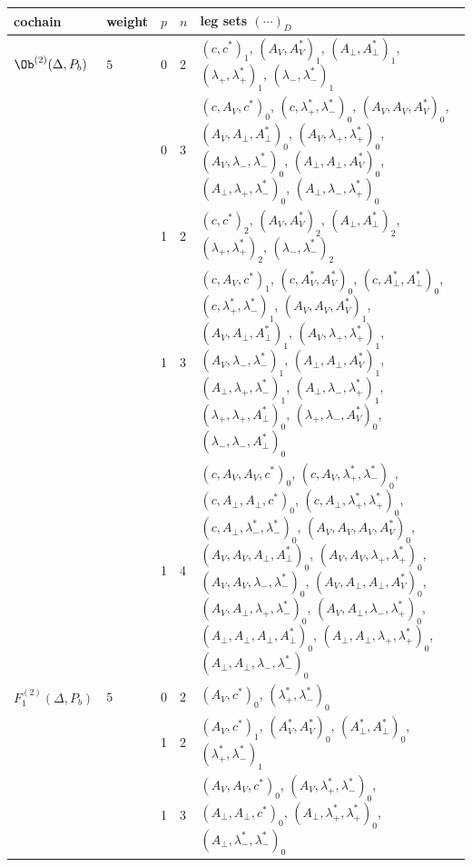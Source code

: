 {\begin{longtable}{>{\raggedright}p{2.3cm}|p{0.6cm}|p{0.25cm}|p{0.25cm}|>{\raggedright\arraybackslash}p{11.6cm}}
cochain & weight & $p$ & $n$ & leg sets $(\cdots)_D$\\
\hline
\endhead
$\Ob^{(2)}(\Delta,P_b)$ & $5$ & 0 & 2 & $(c,c^*)_{1}$, $(A_V,A^*_V)_{1}$, $(A_\perp,A^*_\perp)_{1}$, $(\lambda_+,\lambda^*_+)_{1}$, $(\lambda_-,\lambda^*_-)_{1}$ \\
 &  & 0 & 3 & $(c,A_V,c^*)_{0}$, $(c,\lambda^*_+,\lambda^*_-)_{0}$, $(A_V,A_V,A^*_V)_{0}$, $(A_V,A_\perp,A^*_\perp)_{0}$, $(A_V,\lambda_+,\lambda^*_+)_{0}$, $(A_V,\lambda_-,\lambda^*_-)_{0}$, $(A_\perp,A_\perp,A^*_V)_{0}$, $(A_\perp,\lambda_+,\lambda^*_-)_{0}$, $(A_\perp,\lambda_-,\lambda^*_+)_{0}$ \\
 &  & 1 & 2 & $(c,c^*)_{2}$, $(A_V,A^*_V)_{2}$, $(A_\perp,A^*_\perp)_{2}$, $(\lambda_+,\lambda^*_+)_{2}$, $(\lambda_-,\lambda^*_-)_{2}$ \\
 &  & 1 & 3 & $(c,A_V,c^*)_{1}$, $(c,A^*_V,A^*_V)_{0}$, $(c,A^*_\perp,A^*_\perp)_{0}$, $(c,\lambda^*_+,\lambda^*_-)_{1}$, $(A_V,A_V,A^*_V)_{1}$, $(A_V,A_\perp,A^*_\perp)_{1}$, $(A_V,\lambda_+,\lambda^*_+)_{1}$, $(A_V,\lambda_-,\lambda^*_-)_{1}$, $(A_\perp,A_\perp,A^*_V)_{1}$, $(A_\perp,\lambda_+,\lambda^*_-)_{1}$, $(A_\perp,\lambda_-,\lambda^*_+)_{1}$, $(\lambda_+,\lambda_+,A^*_\perp)_{0}$, $(\lambda_+,\lambda_-,A^*_V)_{0}$, $(\lambda_-,\lambda_-,A^*_\perp)_{0}$ \\
 &  & 1 & 4 & $(c,A_V,A_V,c^*)_{0}$, $(c,A_V,\lambda^*_+,\lambda^*_-)_{0}$, $(c,A_\perp,A_\perp,c^*)_{0}$, $(c,A_\perp,\lambda^*_+,\lambda^*_+)_{0}$, $(c,A_\perp,\lambda^*_-,\lambda^*_-)_{0}$, $(A_V,A_V,A_V,A^*_V)_{0}$, $(A_V,A_V,A_\perp,A^*_\perp)_{0}$, $(A_V,A_V,\lambda_+,\lambda^*_+)_{0}$, $(A_V,A_V,\lambda_-,\lambda^*_-)_{0}$, $(A_V,A_\perp,A_\perp,A^*_V)_{0}$, $(A_V,A_\perp,\lambda_+,\lambda^*_-)_{0}$, $(A_V,A_\perp,\lambda_-,\lambda^*_+)_{0}$, $(A_\perp,A_\perp,A_\perp,A^*_\perp)_{0}$, $(A_\perp,A_\perp,\lambda_+,\lambda^*_+)_{0}$, $(A_\perp,A_\perp,\lambda_-,\lambda^*_-)_{0}$ \\
\hline
$F_1^{(2)}(\Delta,P_b)$ & $5$ & 0 & 2 & $(A_V,c^*)_{0}$, $(\lambda^*_+,\lambda^*_-)_{0}$ \\
 &  & 1 & 2 & $(A_V,c^*)_{1}$, $(A^*_V,A^*_V)_{0}$, $(A^*_\perp,A^*_\perp)_{0}$, $(\lambda^*_+,\lambda^*_-)_{1}$ \\
 &  & 1 & 3 & $(A_V,A_V,c^*)_{0}$, $(A_V,\lambda^*_+,\lambda^*_-)_{0}$, $(A_\perp,A_\perp,c^*)_{0}$, $(A_\perp,\lambda^*_+,\lambda^*_+)_{0}$, $(A_\perp,\lambda^*_-,\lambda^*_-)_{0}$ \\

\end{longtable}}
